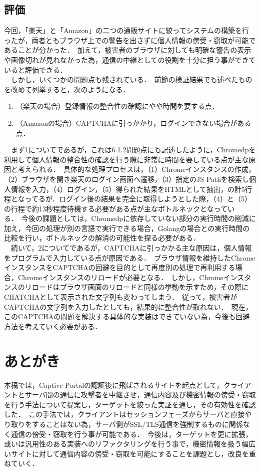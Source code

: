 \documentclass[dvipdfmx,twocolumn]{jsarticle}
\begin{document}
        \subsection{評価}
            今回，「楽天」と「Amazon」の二つの通販サイトに絞ってシステムの構築を行ったが，両者ともブラウザ上での警告を出さずに個人情報の傍受・窃取が可能であることが分かった．\
            加えて，被害者のブラウザに対しても明確な警告の表示や画像切れが見れなかった為，通信の中継としての役割を十分に担う事ができていると評価できる．\\
            　しかし，いくつかの問題点も残されている．\
            前節の検証結果でも述べたものを改めて列挙すると，次のようになる．\
            \begin{enumerate}
                \item （楽天の場合）登録情報の整合性の確認にやや時間を要する点．
                \item （Amazonの場合）CAPTCHAに引っかかり，ログインできない場合がある点．
            \end{enumerate}
            　まず1についてであるが，これは6.1.2問題点にも記述したように，Chromedpを利用して個人情報の整合性の確認を行う際に非常に時間を要している点が主な原因と考えられる．\
            具体的な処理プロセスは，（1）Chromeインスタンスの作成，（2）ブラウザを開き楽天のログイン画面へ遷移，（3）指定のJS Pathを検索し個人情報を入力，（4）ログイン，（5）得られた結果をHTMLとして抽出，の計5行程となってるが．ログイン後の結果を完全に取得しようとした際，（4）と（5）の行程で約13秒程度待機する必要がある点が主なボトルネックとなっている．\
            今後の課題としては，Chromedpに依存していない部分の実行時間の削減に加え，今回の処理が別の言語で実行できる場合，Golangの場合との実行時間の比較を行い，ボトルネックの解消の可能性を探る必要がある．\\
            　続いて，2についてであるが，CAPTCHAに引っかかる主な原因は，個人情報をプログラムで入力している点が原因である．\
            ブラウザ情報を維持したChromeインスタンスをCAPTCHAの回避を目的として再度別の処理で再利用する場合，Chromeインスタンスのリロードが必要となる．\
            しかし，Chromeインスタンスのリロードはブラウザ画面のリロードと同様の挙動を示すため，その際にCHATCHAとして表示された文字列も変わってしまう．\
            従って，被害者がCAPTCHAの文字列を入力したとしても，結果的に整合性が取れない．\
            現在，このCAPTCHAの問題を解決する具体的な実装はできていない為，今後も回避方法を考えていく必要がある．\
    
    \section{あとがき}
        本稿では，Captive Portalの認証後に飛ばされるサイトを起点として，クライアントとサーバ間の通信に攻撃者を中継させ，通信内容及び機密情報の傍受・窃取を行う手法について提案し，ターゲットを絞った実証を通し，その有効性を確認した．\
        この手法では，クライアントはセッションフェーズからサーバと直接やり取りをすることはない為，サーバ側がSSL/TLS通信を強制するものに関係なく通信の傍受・窃取を行う事が可能である．\
        今後は，ターゲットを更に拡張，或いは汎用性のある実装へのリファクタリングを行う事で，機密情報を扱う幅広いサイトに対して通信内容の傍受・窃取を可能にすることを課題とし，改良を重ねていく．
\end{document}
